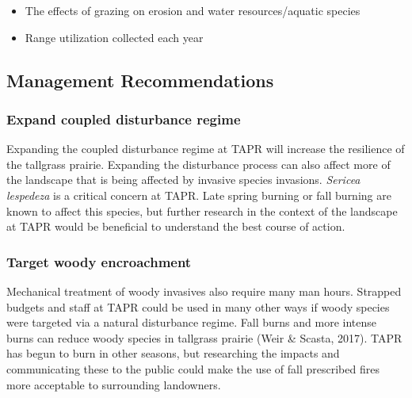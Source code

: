 \begin{itemize}
\item   The effects of grazing on erosion and water resources/aquatic species
\item   Range utilization collected each year
\end{itemize}

\subsection{Management Recommendations} 

\subsubsection{Expand coupled disturbance regime}

Expanding the coupled disturbance regime at TAPR will increase the resilience of the tallgrass prairie. 
Expanding the disturbance process can also affect more of the landscape that is being affected by invasive species invasions. 
\emph{Sericea lespedeza} is a critical concern at TAPR. 
Late spring burning or fall burning are known to affect this species, but further research in the context of the landscape at TAPR would be beneficial to understand the best course of action.

\subsubsection{Target woody encroachment }
 
Mechanical treatment of woody invasives also require many man hours.
Strapped budgets and staff at TAPR could be used in many other ways if woody species were targeted via a natural disturbance regime. 
Fall burns and more intense burns can reduce woody species in tallgrass prairie (Weir \& Scasta, 2017). 
TAPR has begun to burn in other seasons, but researching the impacts and communicating these to the public could make the use of fall prescribed fires more acceptable to surrounding landowners.

